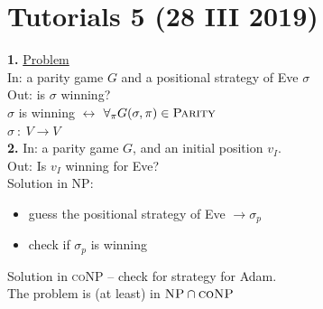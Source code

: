 \section{Tutorials 5 (28 III 2019)}
\textbf{1.} \underline{Problem}\\
In: a parity game $G$ and a positional strategy of Eve $\sigma$\\
Out: is $\sigma$ winning?\\
$\sigma$ is winning $\leftrightarrow$ $\forall_{\pi} G(\sigma, \pi) \in \textsc{Parity}$\\
$\sigma\ :\ V \rightarrow V$\\

\noindent
\textbf{2.} In: a parity game $G$, and an initial position $v_I$.\\
Out: Is $v_I$ winning for Eve?\\
Solution in \textsc{NP}:
\begin{itemize}
	\item guess the positional strategy of Eve $\rightarrow \sigma_{p}$
	\item check if $\sigma_p$ is winning
\end{itemize}
Solution in \textsc{coNP} -- check for strategy for Adam.\\
The problem is (at least) in $\textsc{NP} \cap \textsc{coNP}$\\

